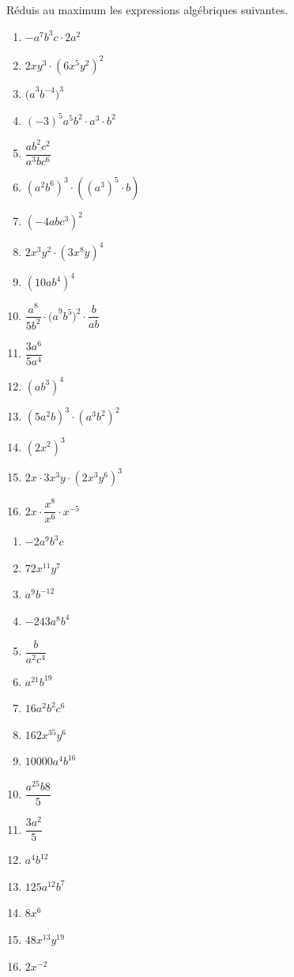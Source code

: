 \begin{exercise}
  Réduis au maximum les expressions algébriques suivantes.
  \begin{enumerate}[cols=2, itemsep=2ex]
    \item $- a^{7}b^{3}c \cdot 2a^{2}$
    \item $2xy^{3} \cdot \left( 6x^{5}y^{2} \right)^{2}$
    \item ${(a}^{3}b^{- 4})^3$
    \item $( - 3)^{5}a^{5}b^{2} \cdot a^{3} \cdot b^{2}$
    \item $\dfrac{ab^{2}c^{2}}{a^{3}bc^{6}}$
    \item $\left( a^{2}b^{6} \right)^{3} \cdot \left( \left( a^{3} \right)^{5} \cdot b \right)$
    \item $\left( - 4abc^{3} \right)^{2}$
    \item $2x^{3}y^{2} \cdot \left( 3x^{8}y \right)^{4}$
    \item $\left( 10ab^{4} \right)^{4}$
    \item $\dfrac{a^{8}}{5b^{2}} \cdot {(a}^{9}b^{5})^2 \cdot \dfrac{b}{ab}$
    \item $\dfrac{3a^{6}}{5a^{4}}$
    \item $\left( ab^{3} \right)^{4}$
    \item $\left( 5a^{2}b \right)^{3} \cdot \left( a^{3}b^{2} \right)^{2}$
    \item $(2x^{2})^3$
    \item $2x \cdot 3x^{3}y \cdot (2x^{3}y^{6})^3$
    \item $2x \cdot \dfrac{x^{8}}{x^{6}} \cdot x^{- 5}$
  \end{enumerate}
\end{exercise}
\begin{solution}
  \begin{enumerate}[cols=4]
    \item $-2a^9b^3c$
    \item $72x^{11}y^7$
    \item $a^9b^{-12}$
    \item $-243 a^8 b^4$
    \item $\dfrac{b}{a^2c^4}$
    \item $a^{21}b^{19}$
    \item $16a^2b^2c^6$
    \item $162x^{35}y^6$
    \item $\num{10000}a^4b^{16}$
    \item $\dfrac{a^{25}b8}{5}$
    \item $\dfrac{3a^2}{5}$
    \item $a^4b^{12}$
    \item $125a^{12}b^{7}$
    \item $8x^6$
    \item $48x^{13}y^{19}$
    \item $2x^{-2}$
  \end{enumerate}
\end{solution}

